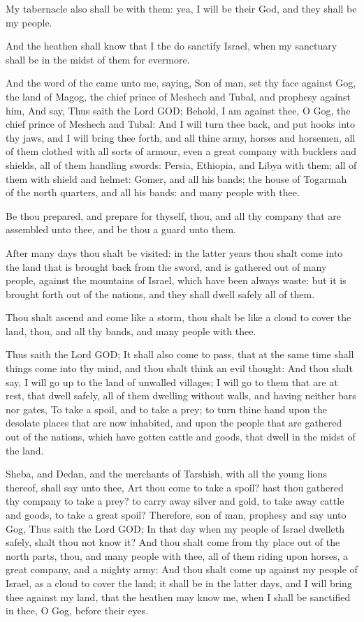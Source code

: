 \Verse My tabernacle also shall be with them: yea, I will be their God, and they shall be my people.

\Verse And the heathen shall know that I the \LORD do sanctify Israel, when my sanctuary shall be in the midst of them for evermore.


\Chapter
\Verse And the word of the \LORD came unto me, saying, \Verse Son of man, set thy face against Gog, the land of Magog, the chief prince of Meshech and Tubal, and prophesy against him, \Verse And say, Thus saith the Lord GOD; Behold, I am against thee, O Gog, the chief prince of Meshech and Tubal: \Verse And I will turn thee back, and put hooks into thy jaws, and I will bring thee forth, and all thine army, horses and horsemen, all of them clothed with all sorts of armour, even a great company with bucklers and shields, all of them handling swords: \Verse Persia, Ethiopia, and Libya with them; all of them with shield and helmet: \Verse Gomer, and all his bands; the house of Togarmah of the north quarters, and all his bands: and many people with thee.

\Verse Be thou prepared, and prepare for thyself, thou, and all thy company that are assembled unto thee, and be thou a guard unto them.

\Verse After many days thou shalt be visited: in the latter years thou shalt come into the land that is brought back from the sword, and is gathered out of many people, against the mountains of Israel, which have been always waste: but it is brought forth out of the nations, and they shall dwell safely all of them.

\Verse Thou shalt ascend and come like a storm, thou shalt be like a cloud to cover the land, thou, and all thy bands, and many people with thee.

\Verse Thus saith the Lord GOD; It shall also come to pass, that at the same time shall things come into thy mind, and thou shalt think an evil thought: \Verse And thou shalt say, I will go up to the land of unwalled villages; I will go to them that are at rest, that dwell safely, all of them dwelling without walls, and having neither bars nor gates, \Verse To take a spoil, and to take a prey; to turn thine hand upon the desolate places that are now inhabited, and upon the people that are gathered out of the nations, which have gotten cattle and goods, that dwell in the midst of the land.

\Verse Sheba, and Dedan, and the merchants of Tarshish, with all the young lions thereof, shall say unto thee, Art thou come to take a spoil? hast thou gathered thy company to take a prey? to carry away silver and gold, to take away cattle and goods, to take a great spoil?  \Verse Therefore, son of man, prophesy and say unto Gog, Thus saith the Lord GOD; In that day when my people of Israel dwelleth safely, shalt thou not know it?  \Verse And thou shalt come from thy place out of the north parts, thou, and many people with thee, all of them riding upon horses, a great company, and a mighty army: \Verse And thou shalt come up against my people of Israel, as a cloud to cover the land; it shall be in the latter days, and I will bring thee against my land, that the heathen may know me, when I shall be sanctified in thee, O Gog, before their eyes.

